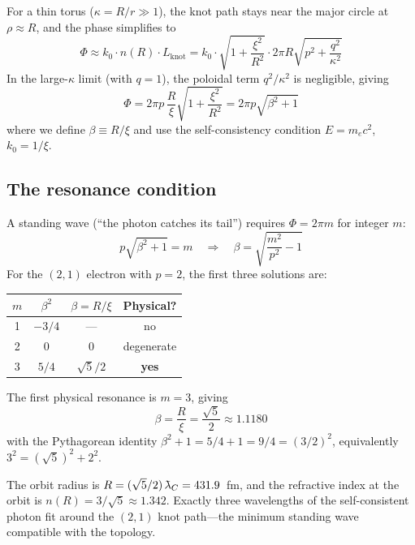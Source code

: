 \documentclass[11pt,a4paper]{article}
\newcommand{\lambdabar}{\mkern0.75mu\mathchar'26\mkern-9.75mu\lambda}
\begin{document}
For a thin torus ($\kappa = R/r \gg 1$), the knot path stays near
the major circle at $\rho \approx R$, and the phase simplifies to
\begin{equation}
  \Phi \approx k_0 \cdot n(R) \cdot L_{\text{knot}}
  = k_0 \cdot \sqrt{1 + \frac{\xi^2}{R^2}} \cdot 2\pi R\sqrt{p^2 + \frac{q^2}{\kappa^2}}
  \label{eq:phase_approx}
\end{equation}
In the large-$\kappa$ limit (with $q = 1$), the poloidal term
$q^2/\kappa^2$ is negligible, giving
\begin{equation}
  \Phi = 2\pi p\,\frac{R}{\xi}\sqrt{1 + \frac{\xi^2}{R^2}}
  = 2\pi p\sqrt{\beta^2 + 1}
  \label{eq:phase_simple}
\end{equation}
where we define $\beta \equiv R/\xi$ and use the self-consistency
condition $E = m_e c^2$, $k_0 = 1/\xi$.


\subsection{The resonance condition}

A standing wave (``the photon catches its tail'') requires
$\Phi = 2\pi m$ for integer $m$:
\begin{equation}
  p\sqrt{\beta^2 + 1} = m
  \quad\Longrightarrow\quad
  \beta = \sqrt{\frac{m^2}{p^2} - 1}
  \label{eq:resonance}
\end{equation}
For the $(2,1)$ electron with $p = 2$, the first three solutions are:
\begin{center}
\begin{tabular}{cccc}
\toprule
$m$ & $\beta^2$ & $\beta = R/\xi$ & Physical? \\
\midrule
1 & $-3/4$   & ---           & no \\
2 & $0$      & $0$           & degenerate \\
3 & $5/4$    & $\sqrt{5}/2$  & \textbf{yes} \\
\bottomrule
\end{tabular}
\end{center}
The first physical resonance is $m = 3$, giving
\begin{equation}
  \boxed{\beta = \frac{R}{\xi} = \frac{\sqrt{5}}{2}
    \approx 1.1180}
  \label{eq:beta}
\end{equation}
with the Pythagorean identity
$\beta^2 + 1 = 5/4 + 1 = 9/4 = (3/2)^2$, equivalently
$3^2 = (\sqrt{5})^2 + 2^2$.

The orbit radius is $R = (\sqrt{5}/2)\,\lambdabar_C = 431.9$~fm,
and the refractive index at the orbit is
$n(R) = 3/\sqrt{5} \approx 1.342$.  Exactly three wavelengths of
the self-consistent photon fit around the $(2,1)$ knot path---the
minimum standing wave compatible with the topology.
\end{document}

